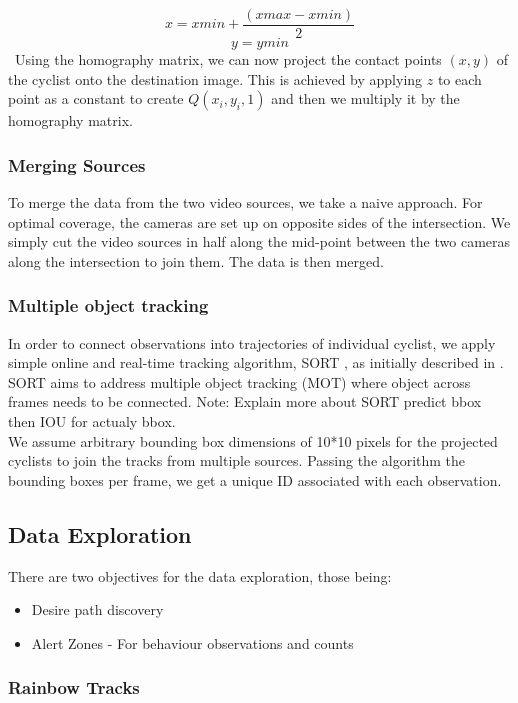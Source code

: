 $$x = xmin + \frac{(xmax - xmin)}{2}$$
$$y = ymin$$
\
Using the homography matrix, we can now project the contact points $(x, y)$ of the cyclist onto the destination
image. This is achieved by applying $z$ to each point as a constant to create $Q(x_i, y_i, 1)$ and then we multiply it by the homography matrix. 

\subsubsection{Merging Sources}

To merge the data from the two video sources, we take a naive approach. For optimal coverage, the cameras are set up on
opposite sides of the intersection. We simply cut the video sources in half along the mid-point between
the two cameras along the intersection to join them. The data is then merged.

\subsubsection{Multiple object tracking}

In order to connect observations into trajectories of individual cyclist, we apply 
simple online and real-time tracking algorithm, SORT \cite{abewley_abewley/sort_2021}, as initially described in \cite{Bewley2016_sort}. 
SORT aims to address multiple object tracking (MOT) where object across frames needs to be connected. 
\color{red}
Note: Explain more about SORT predict bbox then IOU for actualy bbox.
\color{black}
\ \\
We assume arbitrary bounding box dimensions of 10*10 pixels for the projected cyclists to join the tracks from multiple sources. 
Passing the algorithm the bounding boxes per frame, we get a unique ID associated with each observation.

\subsection{Data Exploration}

There are two objectives for the data exploration, those being:
\begin{itemize}
	\item Desire path discovery
	\item Alert Zones - For behaviour observations and counts
\end{itemize}

\subsubsection{Rainbow Tracks}

